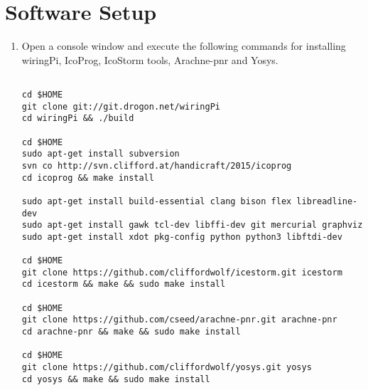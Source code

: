 \documentclass[journal,12pt,twocolumn]{IEEEtran}
\begin{document}
\section{Software Setup}
\begin{enumerate}
%
%
%

\item Open a console window and execute the following commands for installing wiringPi, IcoProg, IcoStorm tools, Arachne-pnr and Yosys.
\begin{lstlisting}

cd $HOME
git clone git://git.drogon.net/wiringPi
cd wiringPi && ./build

cd $HOME
sudo apt-get install subversion
svn co http://svn.clifford.at/handicraft/2015/icoprog
cd icoprog && make install

sudo apt-get install build-essential clang bison flex libreadline-dev 
sudo apt-get install gawk tcl-dev libffi-dev git mercurial graphviz   
sudo apt-get install xdot pkg-config python python3 libftdi-dev

cd $HOME
git clone https://github.com/cliffordwolf/icestorm.git icestorm
cd icestorm && make && sudo make install

cd $HOME
git clone https://github.com/cseed/arachne-pnr.git arachne-pnr
cd arachne-pnr && make && sudo make install

cd $HOME
git clone https://github.com/cliffordwolf/yosys.git yosys
cd yosys && make && sudo make install

\end{lstlisting}








\end{enumerate}
\end{document}

